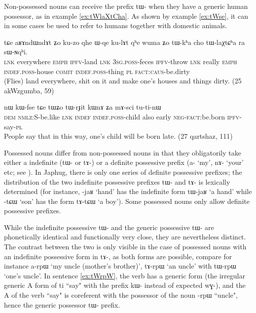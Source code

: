 \documentclass[oldfontcommands,oneside,a4paper,11pt]{article}
\newcommand{\ipa}[1]{{\phon \mbox{#1}}} %
\begin{document}
Non-possessed nouns can receive the prefix \ipa{tɯ-} when they have a generic human possessor, as in example \ref{ex:tWlaXtCha}. As shown by example \ref{ex:tWse}, it can in some cases be used to refer to humans together with domestic animals.

\begin{exe}
\ex \label{ex:tWlaXtCha}
\gll 
\ipa{tɕe}  	\ipa{aʁɤndɯndɤt}  	\ipa{ʑo}  	\ipa{ku-zo}  	\ipa{qhe}  	\ipa{ɯ-qe}  	\ipa{ku-lɤt}  	\ipa{qʰe}	\ipa{wuma}  	\ipa{ʑo}  	\ipa{tɯ-kʰa}  	\ipa{cho}  	\ipa{tɯ-laχtɕʰa}  	\ipa{ra}  	\ipa{sɯ-ɴqʰi.}  \\
\textsc{lnk} everywhere \textsc{emph} \textsc{ipfv}-land \textsc{lnk} \textsc{3sg.poss}-feces \textsc{ipfv}-throw \textsc{lnk} really \textsc{emph} \textsc{indef.poss}-house \textsc{comit} \textsc{indef.poss}-thing \textsc{pl} \textsc{fact:caus}-be.dirty \\
\glt (Flies) land everywhere, shit on it and make one's houses and things dirty. (25 akWzgumba, 59)
\end{exe}

\begin{exe}
\ex
\gll
\ipa{nɯ} 	\ipa{kɯ-fse} 	\ipa{tɕe} 	\ipa{tɯʑo} 	\ipa{tɯ-rɟit} 	\ipa{kɯnɤ} 	\ipa{ʑa} 	\ipa{mɤ-sci} 	\ipa{tu-ti-nɯ} \\
\textsc{dem} \textsc{nmlz}:S-be.like \textsc{lnk} \textsc{indef} \textsc{indef.poss}-child also early \textsc{neg-fact}:be.born \textsc{ipfv}-say-\textsc{pl} \\
\glt People say that in this way, one's child will be born late. (27 qartshaz, 111)
\end{exe}



Possessed nouns differ from non-possessed nouns in that they obligatorily take either a indefinite  (\ipa{tɯ-} or \ipa{tɤ-})  or a definite possessive prefix (\ipa{a-} `my', \ipa{nɤ-} `your' etc; see \citealt{jacques14antipassive}). In Japhug, there is only one series of definite possessive prefixes; the distribution of the two indefinite possessive prefixes \ipa{tɯ-} and \ipa{tɤ-} is lexically determined (for instance, \ipa{-jaʁ} `hand' has the indefinite form \ipa{tɯ-jaʁ} `a hand' while \ipa{-tɕɯ} `son' has the form \ipa{tɤ-tɕɯ} `a boy'). Some possessed nouns only allow definite possessive prefixes.

While the indefinite possessive \ipa{tɯ-} and the generic possessive \ipa{tɯ-} are phonetically identical and functionally very close, they are nevertheless distinct. The contrast between the two is only visible in the case of possessed nouns with an indefinite possessive form in \ipa{tɤ-}, as both forms are possible, compare for instance \ipa{a-rpɯ} `my uncle (mother's brother)', \ipa{tɤ-rpɯ} `an uncle' with \ipa{tɯ-rpɯ} `one's uncle'. In sentence \ref{ex:tWrpW}, the verb has a generic form (the irregular generic A form of \ipa{ti} ``say" with the prefix \ipa{kɯ-} instead of expected \ipa{wɣ-}), and the A of the verb ``say" is coreferent with the possessor of the noun   \ipa{-rpɯ}  ``uncle", hence the generic possessor \ipa{tɯ-} prefix.
\end{document}
